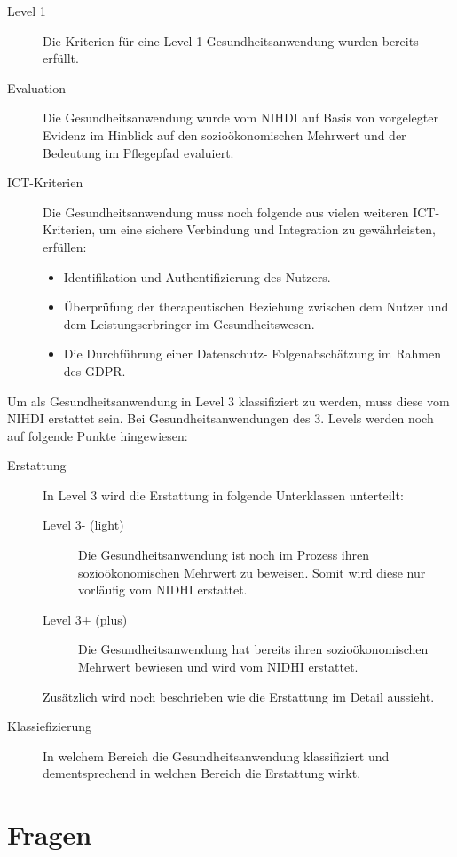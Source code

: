 \documentclass{article}
\begin{document}
			\begin{description}
				\item[Level 1] Die Kriterien für eine Level 1 Gesundheitsanwendung wurden bereits erfüllt.
				\item[Evaluation] Die Gesundheitsanwendung wurde vom NIHDI auf Basis von vorgelegter Evidenz im Hinblick auf den sozioökonomischen Mehrwert und der Bedeutung im Pflegepfad evaluiert. 
				\item[ICT-Kriterien] Die Gesundheitsanwendung muss noch folgende aus vielen weiteren ICT-Kriterien, um eine sichere Verbindung und Integration zu gewährleisten, erfüllen:
					\begin{itemize}
						\item Identifikation und Authentifizierung des Nutzers.
						\item Überprüfung der therapeutischen Beziehung zwischen dem Nutzer und dem Leistungserbringer im Gesundheitswesen.
						\item Die Durchführung einer Datenschutz- Folgenabschätzung im Rahmen des GDPR.
					\end{itemize}
			\end{description}
			Um als Gesundheitsanwendung in Level 3 klassifiziert zu werden, muss diese vom NIHDI erstattet sein. Bei Gesundheitsanwendungen des 3. Levels werden noch auf folgende Punkte hingewiesen:
			\begin{description}
				\item[Erstattung] In Level 3 wird die Erstattung in folgende Unterklassen unterteilt:
					\begin{description}
						\item[Level 3- (light)] Die Gesundheitsanwendung ist noch im Prozess ihren sozioökonomischen Mehrwert zu beweisen. Somit wird diese nur vorläufig vom NIDHI erstattet.
						\item[Level 3+ (plus)] Die Gesundheitsanwendung hat bereits ihren sozioökonomischen Mehrwert bewiesen und wird vom NIDHI erstattet.
					\end{description}
				Zusätzlich wird noch beschrieben wie die Erstattung im Detail aussieht.
				\item[Klassiefizierung] In welchem Bereich die Gesundheitsanwendung klassifiziert und dementsprechend in welchen Bereich die Erstattung wirkt. 
			\end{description} 
			\cite{belgien-pyramide}
			\newpage		
	\section{Fragen}
\end{document}
